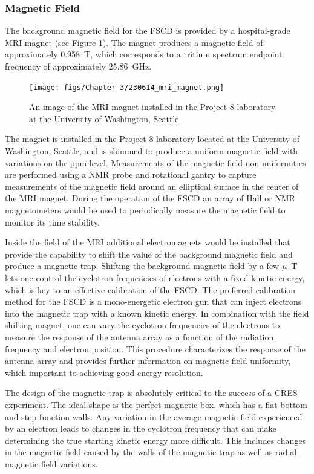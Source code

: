 \subsubsection*{Magnetic Field}

The background magnetic field for the FSCD is provided by a hospital-grade MRI magnet (see Figure \ref{fig:chap3-mri-magnet}). The magnet produces a magnetic field of approximately 0.958~T, which corresponds to a tritium spectrum endpoint frequency of approximately 25.86~GHz. 
\begin{figure}[htbp]
    \centering
    \texttt{[image: figs/Chapter-3/230614\_mri\_magnet.png]}
    \caption{\label{fig:chap3-mri-magnet} An image of the MRI magnet installed in the Project 8 laboratory at the University of Washington, Seattle.}
\end{figure}
The magnet is installed in the Project 8 laboratory located at the University of Washington, Seattle, and is shimmed to produce a uniform magnetic field with variations on the ppm-level. Measurements of the magnetic field non-uniformities are performed using a NMR probe and rotational gantry to capture measurements of the magnetic field around an elliptical surface in the center of the MRI magnet. During the operation of the FSCD an array of Hall or NMR magnetometers would be used to periodically measure the magnetic field to monitor its time stability.

Inside the field of the MRI additional electromagnets would be installed that provide the capability to shift the value of the background magnetic field and produce a magnetic trap. Shifting the background magnetic field by a few $\mu$~T lets one control the cyclotron frequencies of electrons with a fixed kinetic energy, which is key to an effective calibration of the FSCD. The preferred calibration method for the FSCD is a mono-energetic electron gun that can inject electrons into the magnetic trap with a known kinetic energy. In combination with the field shifting magnet, one can vary the cyclotron frequencies of the electrons to measure the response of the antenna array as a function of the radiation frequency and electron position. This procedure characterizes the response of the antenna array and provides further information on magnetic field uniformity, which important to achieving good energy resolution.

The design of the magnetic trap is absolutely critical to the success of a CRES experiment. The ideal shape is the perfect magnetic box, which has a flat bottom and step function walls. Any variation in the average magnetic field experienced by an electron leads to changes in the cyclotron frequency that can make determining the true starting kinetic energy more difficult. This includes changes in the magnetic field caused by the walls of the magnetic trap as well as radial magnetic field variations. 

